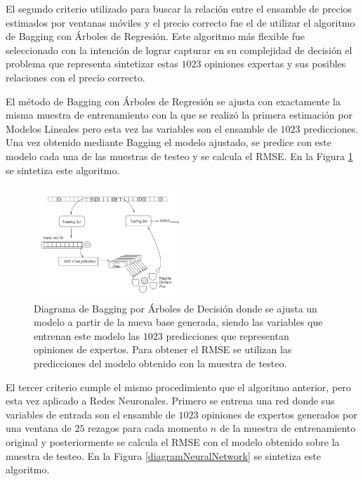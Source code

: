 \documentclass[a4paper,12pt,twocolumn]{article}
\begin{document}
El segundo criterio utilizado para buscar la relación entre el ensamble de precios estimados por ventanas móviles y el precio correcto fue el de utilizar el algoritmo de Bagging con Árboles de Regresión. Este algoritmo más flexible fue seleccionado con la intención de lograr capturar en su complejidad de decisión el problema que representa sintetizar estas $1023$ opiniones expertas y sus posibles relaciones con el precio correcto.

El método de Bagging con Árboles de Regresión se ajusta con exactamente la misma muestra de entrenamiento con la que se realizó la primera estimación por Modelos Lineales pero esta vez las variables son el ensamble de $1023$ predicciones. Una vez obtenido mediante Bagging el modelo ajustado, se predice con este modelo cada una de las muestras de testeo y se calcula el RMSE. En la Figura \ref{diagramBagging} se sintetiza este algoritmo.

\begin{figure}[!hbt]
\centering
\includegraphics[width=0.5\textwidth]{diagramBagging}
\caption{Diagrama de Bagging por Árboles de Decisión donde se ajusta un modelo a partir de la nueva base generada, siendo las variables que entrenan este modelo las $1023$ predicciones que representan opiniones de expertos. Para obtener el RMSE se utilizan las predicciones del modelo obtenido con la muestra de testeo.}
\label{diagramBagging}
\end{figure}

El tercer criterio cumple el mismo procedimiento que el algoritmo anterior, pero esta vez aplicado a Redes Neuronales. Primero se entrena una red donde sus variables de entrada son el ensamble de $1023$ opiniones de expertos generados por una ventana de $25$ rezagos para cada momento $n$ de la muestra de entrenamiento original y posteriormente se calcula el RMSE con el modelo obtenido sobre la muestra de testeo. En la Figura \ref{diagramNeuralNetwork} se sintetiza este algoritmo.
\end{document}
